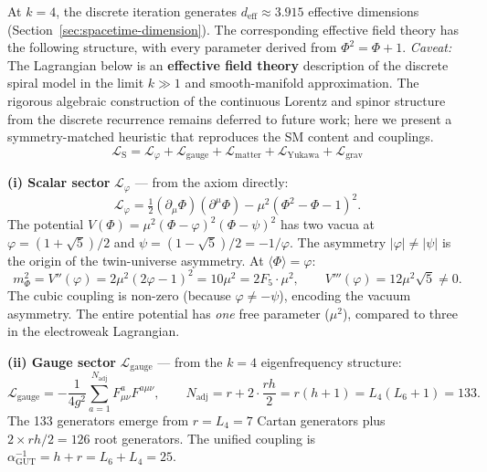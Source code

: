\documentclass[12pt,a4paper]{article}
\begin{document}
At $k = 4$, the discrete iteration generates $d_{\mathrm{eff}} \approx 3.915$ effective dimensions (Section~\ref{sec:spacetime-dimension}). The corresponding effective field theory has the following structure, with every parameter derived from $\Phi^2 = \Phi + 1$. \emph{Caveat:} The Lagrangian below is an \textbf{effective field theory} description of the discrete spiral model in the limit $k \gg 1$ and smooth-manifold approximation. The rigorous algebraic construction of the continuous Lorentz and spinor structure from the discrete recurrence remains deferred to future work; here we present a symmetry-matched heuristic that reproduces the SM content and couplings.
\begin{equation}
\boxed{\mathcal{L}_{\mathrm{S}} = \mathcal{L}_\varphi + \mathcal{L}_{\text{gauge}} + \mathcal{L}_{\text{matter}} + \mathcal{L}_{\text{Yukawa}} + \mathcal{L}_{\text{grav}}}
\end{equation}

\textbf{(i) Scalar sector} $\mathcal{L}_\varphi$ --- from the axiom directly:
\begin{equation}
\mathcal{L}_\varphi = \tfrac{1}{2}(\partial_\mu\Phi)(\partial^\mu\Phi) - \mu^2(\Phi^2 - \Phi - 1)^2.
\label{eq:phi-pot}
\end{equation}
The potential $V(\Phi) = \mu^2(\Phi - \varphi)^2(\Phi - \psi)^2$ has two vacua at $\varphi = (1{+}\sqrt{5})/2$ and $\psi = (1{-}\sqrt{5})/2 = -1/\varphi$. The asymmetry $|\varphi| \neq |\psi|$ is the origin of the twin-universe asymmetry. At $\langle\Phi\rangle = \varphi$:
\begin{equation}
m_\Phi^2 = V''(\varphi) = 2\mu^2(2\varphi{-}1)^2 = 10\mu^2 = 2F_5\cdot\mu^2, \qquad V'''(\varphi) = 12\mu^2\sqrt{5} \neq 0.
\end{equation}
The cubic coupling is non-zero (because $\varphi \neq -\psi$), encoding the vacuum asymmetry. The entire potential has \emph{one} free parameter ($\mu^2$), compared to three in the electroweak Lagrangian.

\textbf{(ii) Gauge sector} $\mathcal{L}_{\text{gauge}}$ --- from the $k = 4$ eigenfrequency structure:
\begin{equation}
\mathcal{L}_{\text{gauge}} = -\frac{1}{4g^2}\sum_{a=1}^{N_{\text{adj}}}F^a_{\mu\nu}F^{a\mu\nu}, \qquad
N_{\text{adj}} = r + 2\cdot\frac{rh}{2} = r(h{+}1) = L_4(L_6{+}1) = 133.
\label{eq:YM}
\end{equation}
The 133 generators emerge from $r = L_4 = 7$ Cartan generators plus $2 \times rh/2 = 126$ root generators. The unified coupling is $\alpha_{\mathrm{GUT}}^{-1} = h + r = L_6 + L_4 = 25$.
\end{document}
